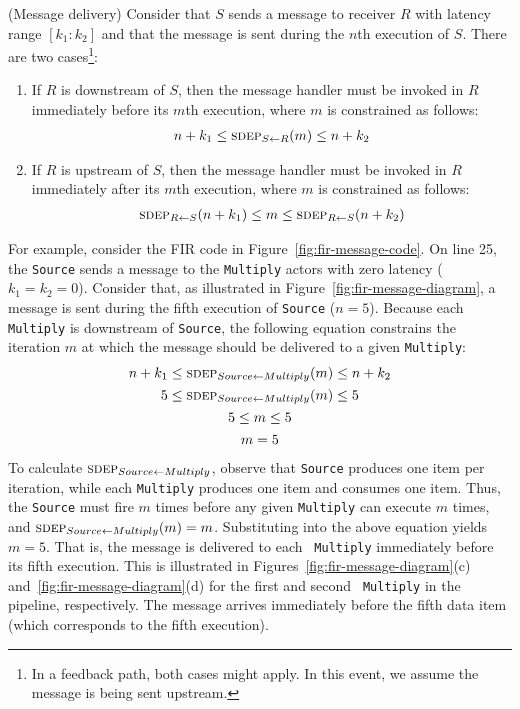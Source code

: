 \begin{definition}(Message delivery)
Consider that $S$ sends a message to receiver $R$ with latency range
$[k_1:k_2]$ and that the message is sent during the $n$th execution of
$S$.  There are two cases\footnote{In a feedback path, both cases
  might apply.  In this event, we assume the message is being sent
  upstream.}:

\begin{enumerate}

\item If $R$ is downstream of $S$, then the message handler must be
invoked in $R$ immediately before its $m$th execution, where $m$
is constrained as follows:
\[
\begin{array}{l}
n+k_1 \le \textsc{sdep}_{S \small{\leftarrow} R}(m) \le n+k_2
\end{array}
\]

\item If $R$ is upstream of $S$, then the message handler must be
invoked in $R$ immediately after its $m$th execution, where $m$ is
constrained as follows:
\[
\begin{array}{l}
\textsc{sdep}_{R \small{\leftarrow} S}(n + k_1) \le m \le \textsc{sdep}_{R \small{\leftarrow} S}(n + k_2)
\end{array}
\]
\end{enumerate}
\end{definition}

For example, consider the FIR code in
Figure~\ref{fig:fir-message-code}.  On line 25, the {\tt Source} sends
a message to the {\tt Multiply} actors with zero latency ($k_1 = k_2 =
0$).  Consider that, as illustrated in
Figure~\ref{fig:fir-message-diagram}, a message is sent during the
fifth execution of {\tt Source} ($n = 5$).  Because each {\tt
Multiply} is downstream of {\tt Source}, the following equation
constrains the iteration $m$ at which the message should be delivered
to a given {\tt Multiply}:
\begin{equation*}
\begin{array}{c}
n+k_1 \le \textsc{sdep}_{Source \small{\leftarrow} Multiply}(m) \le n + k_2 \\[0.9Ex]
5 \le \textsc{sdep}_{Source \small{\leftarrow} Multiply}(m) \le 5 \\[0.9Ex]
5 \le m \le 5 \\[0.9Ex]
m = 5
\end{array}
\end{equation*}
To calculate $\textsc{sdep}_{Source \small{\leftarrow} Multiply}$, observe that {\tt Source}
produces one item per iteration, while each {\tt Multiply} produces
one item and consumes one item.  Thus, the {\tt Source} must fire $m$
times before any given {\tt Multiply} can execute $m$ times, and
$\textsc{sdep}_{Source \small{\leftarrow} Multiply}(m) = m$.  Substituting into the above
equation yields $m=5$.  That is, the message is delivered to each {\tt
Multiply} immediately before its fifth execution.  This is illustrated
in Figures~\ref{fig:fir-message-diagram}(c)
and~\ref{fig:fir-message-diagram}(d) for the first and second {\tt
Multiply} in the pipeline, respectively.  The message arrives
immediately before the fifth data item (which corresponds to the fifth
execution).

